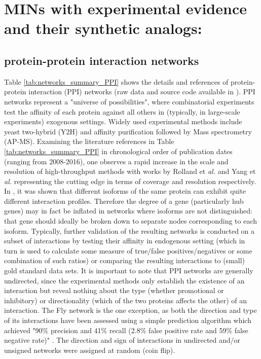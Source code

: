 

\newpage
\section{MINs with experimental evidence and their synthetic analogs: }\label{sup_realnets}
\subsection{protein-protein interaction networks}\label{sec:data_DB_nets}
    Table \ref{tab:networks_summary_PPI}  shows the details and references of protein-protein interaction (PPI) networks (raw data and source code available in  \cite{atiia_case-study_2017}).
    PPI networks represent a "universe of possibilities", where combinatorial experiments test the affinity of each protein against all others in (typically, in large-scale experiments) exogenous settings. Widely used experimental methods include yeast two-hybrid (Y2H) and affinity purification followed by Mass spectrometry (AP-MS). Examining the literature references in Table \ref{tab:networks_summary_PPI} in chronological order of publication dates (ranging from 2008-2016), one observes a rapid increase in the scale  and resolution  of high-throughput methods with works by Rolland et \textit{al.}  \cite{rolland_proteome-scale_2014} and Yang et \textit{al.}  \cite{yang_widespread_2016} representing the cutting edge in terms of coverage and resolution respectively.
    In  \cite{yang_widespread_2016}, it was shown that different isoforms of the same protein can exhibit quite different interaction profiles. Therefore the degree of a gene (particularly hub genes) may in fact be inflated in networks where isoforms are not distinguished: that gene should ideally be broken down to separate nodes corresponding to each isoform.
    Typically, further validation of the resulting networks is conducted on a subset of interactions by testing their affinity in endogenous setting (which in turn is used to calculate some measure of true/false positives/negatives or some combination of such ratios) or comparing the resulting interactions to (small) gold standard data sets. It is important to note that PPI networks are generally undirected, since the experimental methods only establish the existence of an interaction but reveal nothing about the type (whether promotional or inhibitory) or directionality (which of the two proteins affects the other) of an interaction. The Fly network is the one exception, as both the direction and type of its interactions have been assessed using a simple prediction algorithm which achieved "90\% precision and 41\% recall (2.8\% false positive rate and 59\% false negative rate)"  \cite{vinayagam_integrating_2014}. The direction and sign of interactions in undirected and/or unsigned networks were assigned at random (coin flip). 
